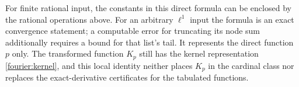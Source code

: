 For finite rational input, the constants in this direct formula can be
enclosed by the rational operations above.  For an arbitrary $\ell^1$
input the formula is an exact convergence statement; a computable error
for truncating its node sum additionally requires a bound for that list's
tail.  It represents the direct function $p$ only.  The transformed
function $K_p$ still has the kernel representation
\eqref{fourier:kernel}, and this local identity neither places $K_p$ in
the cardinal class nor replaces the exact-derivative certificates for the
tabulated functions.
